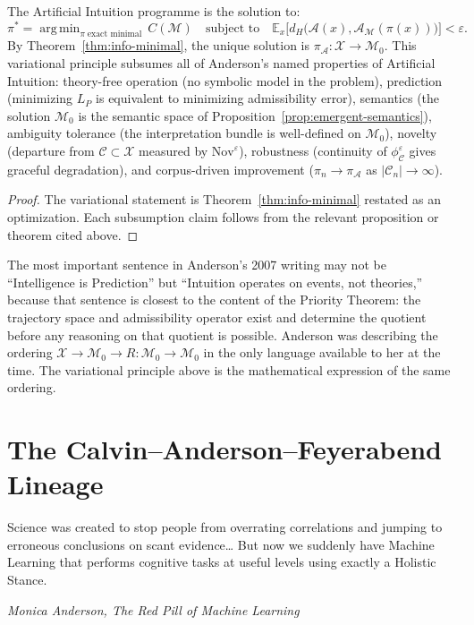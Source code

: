 \documentclass[12pt, a4paper, oneside]{book}
\newcommand{\Adm}{\mathcal{A}}
\newcommand{\X}{\mathcal{X}}
\newcommand{\M}{\mathcal{M}}
\newcommand{\C}{\mathcal{C}}
\newcommand{\proj}{\pi}
\newcommand{\projA}{\pi_{\!\Adm}}
\newcommand{\dH}{d_H}
\newcommand{\Nov}{\mathrm{Nov}}
\newcommand{\phiCe}{\phi_{\C}^{\varepsilon}}
\DeclareMathOperator{\argmin}{arg\,min}
\begin{document}
\begin{theorem}
\label{thm:ai-variational}
The Artificial Intuition programme is the solution to:
\[
  \proj^*
  = \argmin_{\proj \;\text{exact minimal}}\, C(\M)
  \quad \text{subject to} \quad
  \mathbb{E}_x\bigl[\dH\bigl(\Adm(x), \Adm_\M(\proj(x))\bigr)\bigr]
  < \varepsilon.
\]
By Theorem~\ref{thm:info-minimal}, the unique solution is
$\projA : \X \to \M_0$. This variational principle subsumes all of
Anderson's named properties of Artificial Intuition:
theory-free operation (no symbolic model in the problem),
prediction (minimizing $L_P$ is equivalent to minimizing admissibility
error), semantics (the solution $\M_0$ is the semantic space of
Proposition~\ref{prop:emergent-semantics}), ambiguity tolerance
(the interpretation bundle is well-defined on $\M_0$), novelty
(departure from $\C \subset \X$ measured by $\Nov^\varepsilon$),
robustness (continuity of $\phiCe$ gives graceful degradation), and
corpus-driven improvement ($\proj_n \to \projA$ as $|\C_n| \to \infty$).
\end{theorem}

\begin{proof}
The variational statement is Theorem~\ref{thm:info-minimal} restated
as an optimization. Each subsumption claim follows from the relevant
proposition or theorem cited above.
\end{proof}

\begin{remark}
The most important sentence in Anderson's 2007 writing may not be
``Intelligence is Prediction'' but ``Intuition operates on events, not
theories,'' because that sentence is closest to the content of the
Priority Theorem: the trajectory space and admissibility operator exist
and determine the quotient before any reasoning on that quotient is
possible. Anderson was describing the ordering
$\X \to \M_0 \to R : \M_0 \to \M_0$ in the only language available to
her at the time. The variational principle above is the mathematical
expression of the same ordering.
\end{remark}

\chapter{The Calvin--Anderson--Feyerabend Lineage}
\label{ch:lineage}

\epigraph{%
  Science was created to stop people from overrating correlations
  and jumping to erroneous conclusions on scant evidence\ldots
  But now we suddenly have Machine Learning that performs cognitive
  tasks at useful levels using exactly a Holistic Stance.%
}{\textit{Monica Anderson, \emph{The Red Pill of Machine Learning}}}
\end{document}
